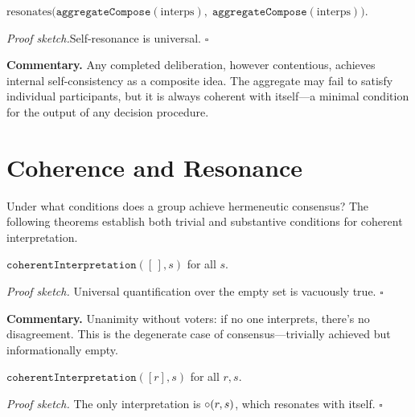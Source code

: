 \begin{theorem}
\label{thm:aggregate_self_resonance}
$\text{resonates}\bigl(\texttt{aggregateCompose}(\text{interps}),\;
\texttt{aggregateCompose}(\text{interps})\bigr)$.
\end{theorem}

\noindent\textit{Proof sketch.}\quad Self-resonance is universal. \hfill$\square$

\medskip

\noindent\textbf{Commentary.}
Any completed deliberation, however contentious, achieves internal
self-consistency as a composite idea.  The aggregate may fail to satisfy
individual participants, but it is always coherent with itself---a minimal
condition for the output of any decision procedure.

\section{Coherence and Resonance}
\label{sec:ch19-coherence}

Under what conditions does a group achieve hermeneutic consensus?
The following theorems establish both trivial and substantive conditions
for coherent interpretation.

\begin{theorem}
\label{thm:empty_coherent}
$\texttt{coherentInterpretation}([\,], s)$ for all $s$.
\end{theorem}

\noindent\textit{Proof sketch.}\quad
Universal quantification over the empty set is vacuously true.
\hfill$\square$

\medskip

\noindent\textbf{Commentary.}
Unanimity without voters: if no one interprets, there's no disagreement.
This is the degenerate case of consensus---trivially achieved but
informationally empty.

\begin{theorem}
\label{thm:singleton_coherent}
$\texttt{coherentInterpretation}([r], s)$ for all $r, s$.
\end{theorem}

\noindent\textit{Proof sketch.}\quad
The only interpretation is $\circ(r, s)$, which resonates with itself.
\hfill$\square$

\medskip

